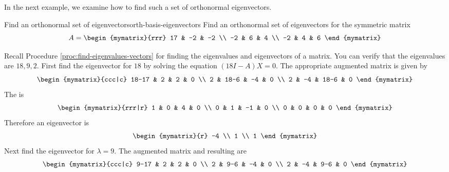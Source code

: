 In the next example, we examine how to find such a set of orthonormal eigenvectors.

\begin{example}{Find an orthonormal set of eigenvectors}{orth-basis-eigenvectors}
Find an orthonormal set of eigenvectors for the symmetric matrix
\begin{equation*}
A = \begin{mymatrix}{rrr}
17 & -2 & -2 \\
-2 & 6 & 4 \\
-2 & 4 & 6
\end{mymatrix}
\end{equation*}
\end{example}

\begin{solution}
Recall Procedure \ref{proc:find-eigenvalues-vectors} for finding the eigenvalues and eigenvectors of a matrix. You can verify that the eigenvalues are $18,9,2$. First find the eigenvector for $18$ by solving the equation $(18I-A)X = 0$. 
The appropriate augmented matrix is given by  
\begin{equation*}
\begin{mymatrix}{ccc|c}
18-17 & 2 & 2 & 0 \\ 
2 & 18-6 & -4 & 0 \\ 
2 & -4 & 18-6 & 0
\end{mymatrix}
\end{equation*}
The {\rref} is 
\begin{equation*}
\begin{mymatrix}{rrr|r}
1 & 0 & 4 & 0 \\ 
0 & 1 & -1 & 0 \\ 
0 & 0 & 0 & 0
\end{mymatrix}
\end{equation*}
Therefore an eigenvector is 
\begin{equation*}
\begin{mymatrix}{r}
-4 \\ 
1 \\ 
1
\end{mymatrix}
\end{equation*}
Next find the eigenvector for $\lambda =9$. The augmented matrix and resulting {\rref} are 
\begin{equation*}
\begin{mymatrix}{ccc|c}
9-17 & 2 & 2 & 0 \\ 
2 & 9-6 & -4 & 0 \\ 
2 & -4 & 9-6 & 0
\end{mymatrix}

\end{equation*}
\end{solution}
